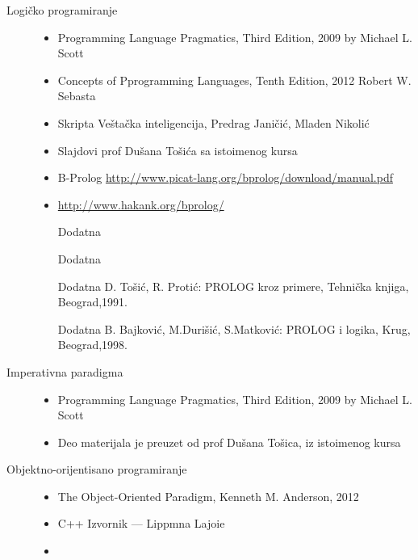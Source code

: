 \documentclass[main.tex]{subfiles}
\begin{document}
\begin{description}
\item[Logičko programiranje] \hfill
\begin{itemize}
\item Programming Language Pragmatics, Third Edition, 2009 by Michael L. Scott
\item Concepts of Pprogramming Languages, Tenth Edition, 2012 Robert W. Sebasta
\item Skripta Veštačka inteligencija, Predrag Janičić, Mladen Nikolić
\item Slajdovi prof Dušana Tošića sa istoimenog kursa
\item B-Prolog \href{http://www.picat-lang.org/bprolog/download/manual.pdf}
				{http://www.picat-lang.org/bprolog/download/manual.pdf}
\item \href{http://www.hakank.org/bprolog/}{http://www.hakank.org/bprolog/}
\item [Dodatna] 
\item [Dodatna] 
\item [Dodatna] D. Tošić, R. Protić: PROLOG kroz primere, Tehnička knjiga, Beograd,1991.
\item [Dodatna]B. Bajković, M.Durišić, S.Matković: PROLOG i logika, Krug, Beograd,1998.
\end{itemize}

\item[Imperativna paradigma] \hfill
\begin{itemize}
\item Programming Language Pragmatics, Third Edition, 2009 by Michael L. Scott
\item Deo materijala je preuzet od prof Dušana Tošica, iz istoimenog kursa
\end{itemize}

\item[Objektno-orijentisano programiranje] \hfill
\begin{itemize}
\item The Object-Oriented Paradigm, Kenneth M. Anderson, 2012
\item C++ Izvornik — Lippmna Lajoie
\item {}
\end{itemize}


\end{description}
\end{document}
